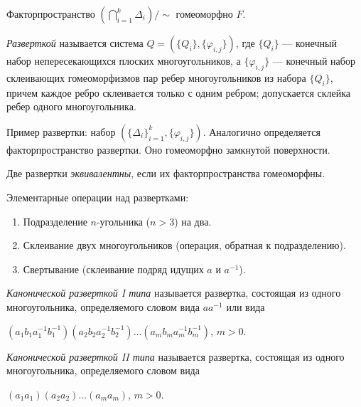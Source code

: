 \documentclass[12pt,a4paper]{article}
\begin{document}
    \begin{theorem}
        Факторпространство $(\bigcap_{i=1}^k \Delta_i)/\sim$ гомеоморфно $F$.
    \end{theorem}

    \begin{definition}
        \emph{Разверткой} называется система $Q = (\{Q_i\}, \{\varphi_{i,j}\})$, где $\{Q_i\}$ --- конечный набор непересекающихся плоских многоугольников, а $\{\varphi_{i, j}\}$ --- конечный набор склеивающих гомеоморфизмов пар ребер многоугольников из набора $\{Q_i\}$, причем каждое ребро склеивается только с одним ребром; допускается склейка ребер одного многоугольника.
    \end{definition}

    \begin{remark*}
        Пример развертки: набор $(\{\Delta_i\}_{i=1}^k, \{\varphi_{i,j}\})$. Аналогично определяется факторпространство развертки. Оно гомеоморфно замкнутой поверхности.
    \end{remark*}

    \begin{definition}
        Две развертки \emph{эквивалентны}, если их факторпространства гомеоморфны.
    \end{definition}

    \begin{remark}
        Элементарные операции над развертками:
        \begin{enumerate}
            \item Подразделение $n$-угольника ($n > 3$) на два.
            \item Склеивание двух многоугольников (операция, обратная к подразделению).
            \item Свертывание (склеивание подряд идущих $a$ и $a^{-1}$).
        \end{enumerate}
    \end{remark}

    \begin{definition}
        \emph{Канонической разверткой I типа} называется развертка, состоящая из одного многоугольника, определяемого словом вида $aa^{-1}$ или вида
        \begin{center}
            $(a_1 b_1 a_1^{-1} b_1^{-1}) (a_2 b_2 a_2^{-1} b_2^{-1}) \dots (a_m b_m a_m^{-1} b_m^{-1})$, $m > 0$.
        \end{center}

        \emph{Канонической разверткой II типа} называется развертка, состоящая из одного многоугольника, определяемого словом вида
        \begin{center}
            $(a_1 a_1) (a_2 a_2) \dots (a_m a_m)$, $m > 0$.
        \end{center}
    \end{definition}
\end{document}
